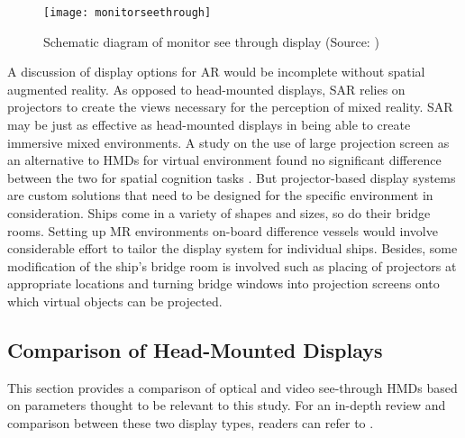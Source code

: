 \begin{figure}
	\centering
	\texttt{[image: monitorseethrough]}
	\caption{Schematic diagram of monitor see through display (Source: \cite{azuma1997survey})}
	\label{fig:monitorseethrough}
\end{figure}

A discussion of display options for AR would be incomplete without spatial augmented reality. As opposed to head-mounted displays, SAR relies on projectors to create the views necessary for the perception of mixed reality. SAR may be just as effective as head-mounted displays in being able to create immersive mixed environments. A study on the use of large projection screen as an alternative to HMDs for virtual environment found no significant difference between the two for spatial cognition tasks \parencite{patrick2000using}. But projector-based display systems are custom solutions that need to be designed for the specific environment in consideration. Ships come in a variety of shapes and sizes, so do their bridge rooms. Setting up MR environments on-board difference vessels would involve considerable effort to tailor the display system for individual ships. Besides, some modification of the ship's bridge room is involved such as placing of projectors at appropriate locations and turning bridge windows into projection screens onto which virtual objects can be projected.

\subsection{Comparison of Head-Mounted Displays}
This section provides a comparison of optical and video see-through HMDs based on parameters thought to be relevant to this study. For an in-depth review and comparison between these two display types, readers can refer to \cite{rolland1995comparison}.

